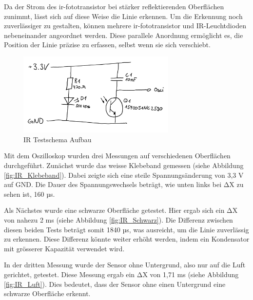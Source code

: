 \documentclass[../main.tex]{subfiles}
\begin{document}
Da der Strom des \gls{ir-fototransistor} bei stärker reflektierenden Oberflächen zunimmt, lässt sich auf diese Weise die Linie erkennen. Um die Erkennung noch zuverlässiger zu gestalten, können mehrere \gls{ir-fototransistor} und IR-Leuchtdioden nebeneinander angeordnet werden. Diese parallele Anordnung ermöglicht es, die Position der Linie präzise zu erfassen, selbst wenn sie sich verschiebt.


\begin{figure}[H] %
    \centering
    \includegraphics[width=0.7\textwidth]{img/sensortest/IR_Schema.png} %
    \caption{IR Testschema Aufbau}
    \label{fig:IR_Schema} %
\end{figure}

Mit dem Oszilloskop wurden drei Messungen auf verschiedenen Oberflächen durchgeführt. Zunächst wurde das weisse Klebeband gemessen (siehe Abbildung \ref{fig:IR_Klebeband}). Dabei zeigte sich eine steile Spannungsänderung von 3,3 V auf GND. Die Dauer des Spannungswechsels beträgt, wie unten links bei
ΔX zu sehen ist, 160 µs.

Als Nächstes wurde eine schwarze Oberfläche getestet. Hier ergab sich ein ΔX von nahezu 2 ms (siehe Abbildung \ref{fig:IR_Schwarz}). Die Differenz zwischen diesen beiden Tests beträgt somit 1840 µs, was ausreicht, um die Linie zuverlässig zu erkennen. Diese Differenz könnte weiter erhöht werden, indem ein Kondensator mit grösserer Kapazität verwendet wird.

In der dritten Messung wurde der Sensor ohne Untergrund, also nur auf die Luft gerichtet, getestet. Diese Messung ergab ein ΔX von 1,71 ms (siehe Abbildung \ref{fig:IR_Luft}). Dies bedeutet, dass der Sensor ohne einen Untergrund eine schwarze Oberfläche erkennt.
\end{document}
